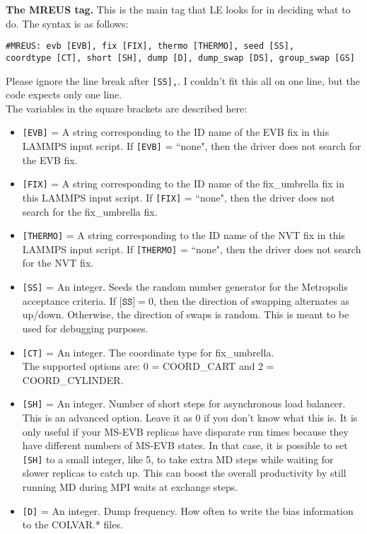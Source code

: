 \documentclass[10pt]{article}
\begin{document}
\textbf{The MREUS tag.}
This is the main tag that LE looks for in deciding what to do.
The syntax is as follows:
\begin{verbatim}
#MREUS: evb [EVB], fix [FIX], thermo [THERMO], seed [SS], 
coordtype [CT], short [SH], dump [D], dump_swap [DS], group_swap [GS]
\end{verbatim}
Please ignore the line break after \texttt{[SS],}. I couldn't fit this all on one line, but the code expects only one line.\\
The variables in the square brackets are described here:
\begin{itemize}
\item	\texttt{[EVB]} = A string corresponding to the ID name of the EVB fix
		in this LAMMPS input script. If \texttt{[EVB]} = ``none", then the driver does
		not search for the EVB fix.
\item	\texttt{[FIX]} = A string corresponding to the ID name of the fix\_umbrella fix
		in this LAMMPS input script. If \texttt{[FIX]} = ``none", then the driver does
		not search for the fix\_umbrella fix.
\item	\texttt{[THERMO]} = A string corresponding to the ID name of the NVT fix
		in this LAMMPS input script. If \texttt{[THERMO]} = ``none", then the driver does
		not search for the NVT fix.
\item	\texttt{[SS]} = An integer. Seeds the random number generator for the Metropolis
		acceptance criteria.
		If $\texttt{[SS]} = 0$,
		then the direction of swapping alternates as up/down. Otherwise, the direction of swaps
		is random. This is meant to be used for debugging purposes.
\item	\texttt{[CT]} = An integer. The coordinate type for fix\_umbrella.\\
		The supported options are: 0 = COORD\_CART and 2 = COORD\_CYLINDER.
\item	\texttt{[SH]} = An integer. Number of short steps for asynchronous load balancer. This is an advanced option.
		Leave it as 0 if you don't know what this is. It is only useful if your MS-EVB replicas have disparate run times
		because they have different numbers of MS-EVB states. In that case, it is possible to set \texttt{[SH]} to a
		small integer, like 5, to take extra MD steps while waiting for slower replicas to catch up. This can boost
		the overall productivity by still running MD during MPI waits at exchange steps.
\item	\texttt{[D]} = An integer. Dump frequency. How often to write the bias information to the COLVAR.* files.

\end{itemize}
\end{document}
